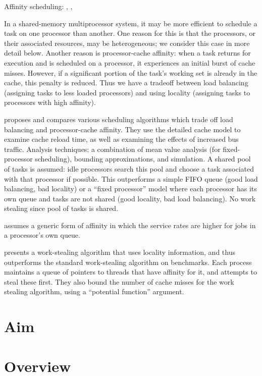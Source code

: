 
Affinity scheduling: \cite{Squillante1993}, \cite{Squillante2001},
\cite{Acar2002}

In a shared-memory multiprocessor system, it may be more efficient to
schedule a task on one processor than another. One reason for this is
that the processors, or their associated resources, may be
heterogeneous; we consider this case in more detail below. Another
reason is processor-cache affinity: when a task returns for execution
and is scheduled on a processor, it experiences an initial burst of
cache misses. However, if a significant portion of the task's working
set is already in the cache, this penalty is reduced. Thus we have a
tradeoff between load balancing (assigning tasks to less loaded
processors) and using locality (assigning tasks to processors with
high affinity).

\cite{Squillante1993} proposes and compares various scheduling
algorithms which trade off load balancing and processor-cache
affinity. They use the detailed cache model to examine cache reload
time, as well as examining the effects of increased bus
traffic. Analysis techniques: a combination of mean value analysis
(for fixed-processor scheduling), bounding approximations, and
simulation. A shared pool of tasks is assumed: idle processors search
this pool and choose a task associated with that processor if
possible. This outperforms a simple FIFO queue (good load balancing,
bad locality) or a ``fixed processor'' model where each processor has
its own queue and tasks are not shared (good locality, bad load
balancing). No work stealing since pool of tasks is shared.

\cite{Squillante2001} assumes a generic form of affinity in which the
service rates are higher for jobs in a processor's own queue.

\cite{Acar2002} presents a work-stealing algorithm that uses locality
information, and thus outperforms the standard work-stealing algorithm
on benchmarks. Each process maintains a queue of pointers to threads
that have affinity for it, and attempts to steal these first. They
also bound the number of cache misses for the work stealing algorithm,
using a ``potential function'' argument.


\section{Aim}
\label{sec:locality-intro-aim}


\section{Overview}
\label{sec:locality-intro-overview}



